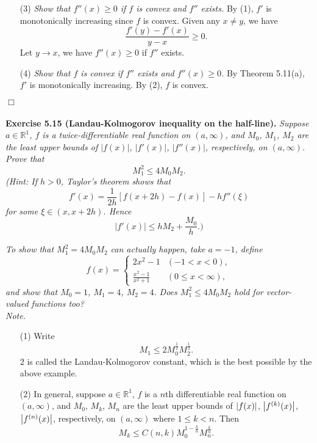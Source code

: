 \documentclass{article}
\begin{document}
\begin{enumerate}
\item[(3)]
  \emph{Show that $f''(x) \geq 0$ if $f$ is convex and $f''$ exists.}
  By (1), $f'$ is monotonically increasing since $f$ is convex.
  Given any $x \neq y$, we have
  \[
    \frac{f'(y)-f'(x)}{y - x} \geq 0.
  \]
  Let $y \to x$, we have $f''(x) \geq 0$ if $f''$ exists.

\item[(4)]
  \emph{Show that $f$ is convex if $f''$ exists and $f''(x) \geq 0$.}
  By Theorem 5.11(a), $f'$ is monotonically increasing.
  By (2), $f$ is convex.
\end{enumerate}
$\Box$ \\\\






\textbf{Exercise 5.15 (Landau-Kolmogorov inequality on the half-line).}
\emph{Suppose $a \in \mathbb{R}^1$,
$f$ is a twice-differentiable real function on $(a,\infty)$,
and $M_0$, $M_1$, $M_2$ are the least upper bounds of
$|f(x)|$, $|f'(x)|$, $|f''(x)|$, respectively, on $(a,\infty)$.
Prove that
\[
  M_1^2 \leq 4 M_0 M_2.
\]
(Hint: If $h>0$, Taylor's theorem shows that
\[
  f'(x) = \frac{1}{2h} [ f(x+2h) - f(x) ] - h f''(\xi)
\]
for some $\xi \in (x,x+2h)$.
Hence
\[
  |f'(x)| \leq h M_2 + \frac{M_0}{h}.)
\]}

\emph{To show that $M_1^2=4 M_0 M_2$ can actually happen, take $a=-1$, define
\begin{equation*}
  f(x) =
    \begin{cases}
      2x^2 - 1            & (-1 < x < 0), \\
      \frac{x^2-1}{x^2+1} & (0 \leq x < \infty),
    \end{cases}
\end{equation*}
and show that $M_0 = 1$, $M_1 = 4$, $M_2 = 4$.}
\emph{Does $M_1 ^2 \leq 4 M_0 M_2$ hold for vector-valued functions too?} \\



\emph{Note.}
\begin{enumerate}
\item[(1)]
Write
\[
  M_1 \leq 2 M_0^{\frac{1}{2}} M_2^{\frac{1}{2}}.
\]
$2$ is called the Landau-Kolmogorov constant,
which is the best possible by the above example.

\item[(2)]
In general,
suppose $a \in \mathbb{R}^1$,
$f$ is a $n$th differentiable real function on $(a,\infty)$,
and $M_0$, $M_k$, $M_n$ are the least upper bounds of
$\abs{ f(x) }$, $\abs{ f^{(k)}(x) }$, $\abs{ f^{(n)}(x) }$, respectively, on $(a,\infty)$
where $1 \leq k < n$.
Then
\[
  M_k \leq C(n,k) M_0^{1 - \frac{k}{n}} M_n^{\frac{k}{n}}.
\]
\end{enumerate}
\end{document}
